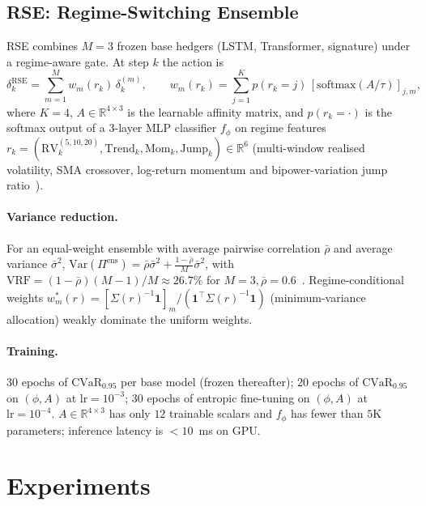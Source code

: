 \documentclass[11pt]{article}
\newcommand{\cvar}{\mathrm{CVaR}}
\newcommand{\R}{\mathbb{R}}
\begin{document}
\subsection{RSE: Regime-Switching Ensemble}\label{sec:rse}

RSE combines $M=3$ frozen base hedgers (LSTM, Transformer, signature) under a regime-aware gate.  At step $k$ the action is
\begin{equation}
\delta_k^{\mathrm{RSE}} = \sum_{m=1}^M w_m(r_k)\,\delta_k^{(m)},
\qquad
w_m(r_k) = \sum_{j=1}^K p(r_k=j)\,[\mathrm{softmax}(A/\tau)]_{j,m},
\label{eq:rse}
\end{equation}
where $K=4$, $A\in\R^{4\times 3}$ is the learnable affinity matrix, and $p(r_k=\cdot)$ is the softmax output of a $3$-layer MLP classifier $f_\phi$ on regime features $r_k=(\mathrm{RV}_k^{(5,10,20)},\mathrm{Trend}_k,\mathrm{Mom}_k,\mathrm{Jump}_k)\in\R^6$ (multi-window realised volatility, SMA crossover, log-return momentum and bipower-variation jump ratio~\citep{barndorffnielsen2002econometric}).

\paragraph{Variance reduction.}  For an equal-weight ensemble with average pairwise correlation $\bar\rho$ and average variance $\bar\sigma^2$, $\mathrm{Var}(\Pi^{\mathrm{ens}}) = \bar\rho\bar\sigma^2 + \frac{1-\bar\rho}{M}\bar\sigma^2$, with $\mathrm{VRF}=(1-\bar\rho)(M-1)/M\approx 26.7\%$ for $M=3,\bar\rho=0.6$~\citep{dietterich2000ensemble}.  Regime-conditional weights $w_m^*(r) = [\Sigma(r)^{-1}\mathbf{1}]_m / (\mathbf{1}^\top\Sigma(r)^{-1}\mathbf{1})$ (minimum-variance allocation) weakly dominate the uniform weights.

\paragraph{Training.}  $30$ epochs of $\cvar_{0.95}$ per base model (frozen thereafter); $20$ epochs of $\cvar_{0.95}$ on $(\phi,A)$ at $\mathrm{lr}=10^{-3}$; $30$ epochs of entropic fine-tuning on $(\phi,A)$ at $\mathrm{lr}=10^{-4}$.  $A\in\R^{4\times 3}$ has only $12$ trainable scalars and $f_\phi$ has fewer than $5$K parameters; inference latency is $<10$~ms on GPU.

\section{Experiments}\label{sec:experiments}
\end{document}
